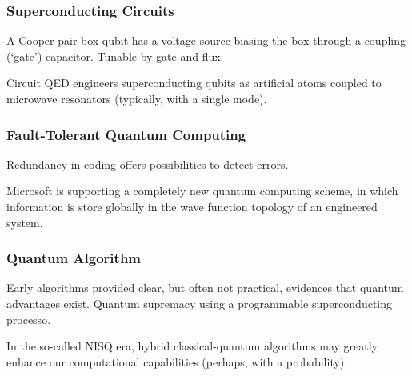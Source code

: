 \subsubsection{Superconducting Circuits}
A Cooper pair box qubit has a voltage source biasing the box through a coupling (`gate') capacitor. Tunable by gate and flux.

Circuit QED engineers superconducting qubits as artificial atoms coupled to microwave resonators (typically, with a single mode).

\subsubsection{Fault-Tolerant Quantum Computing}
Redundancy in coding offers possibilities to detect errors.

Microsoft is supporting a completely new quantum computing scheme, in which information is store globally in the wave function topology of an engineered system.

\subsubsection{Quantum Algorithm}
Early algorithms provided clear, but often not practical, evidences that quantum advantages exist. Quantum supremacy using a programmable superconducting processo. 

In the so-called NISQ era, hybrid classical-quantum algorithms may greatly enhance our computational capabilities (perhaps, with a probability).